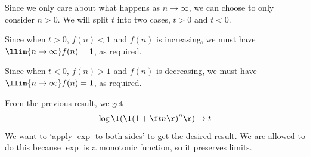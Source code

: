 \documentclass[a4paper]{article}
\begin{document}
Since we only care about what happens as $n \to \infty$, we can choose to only consider $n > 0$. We will split $t$ into two cases, $t > 0$ and $t < 0$.


Since when $t > 0$, $f(n) < 1$ and $f(n)$ is increasing, we must have $\llim{n \to \infty} f(n) = 1$, as required.


Since when $t < 0$, $f(n) > 1$ and $f(n)$ is decreasing, we must have $\llim{n \to \infty} f(n) = 1$, as required.

From the previous result, we get \[
\log \l( {\l( 1 + \f tn \r)}^n \r) \to t
\] We want to \enquote*{apply $\exp$ to both sides} to get the desired result. We are allowed to do this because $\exp$ is a monotonic function, so it preserves limits.

\end{document}
